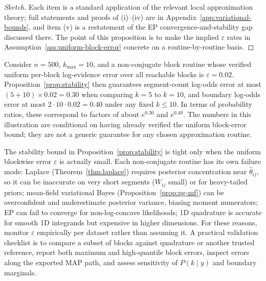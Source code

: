 \begin{proof}[Sketch]
Each item is a standard application of the relevant local approximation theory; full statements
and proofs of (i)--(iv) are in Appendix~\ref{app:variational-bounds}, and item (v) is a
restatement of the EP convergence-and-stability gap discussed there. The point of this proposition
is to make the implied $\varepsilon$ rates in Assumption~\ref{ass:uniform-block-error} concrete on
a routine-by-routine basis.
\end{proof}

\begin{remark}
\label{rem:stability-numerical}
Consider $n=500$, $k_{\max}=10$, and a non-conjugate block routine whose verified uniform
per-block log-evidence error over all reachable blocks is $\varepsilon=0.02$. Proposition~\ref{prop:stability}
then guarantees segment-count log-odds error at most $(5+10)\times0.02=0.30$ when comparing
$k=5$ to $k=10$, and boundary log-odds error at most $2\cdot10\cdot0.02=0.40$ under any fixed
$k\le10$. In terms of probability ratios, these correspond to factors of about $e^{0.30}$ and
$e^{0.40}$. The numbers in this illustration are conditional on having already verified the
uniform block-error bound; they are not a generic guarantee for any chosen approximation routine.
\end{remark}

\begin{remark}
\label{rem:failure-modes}
The stability bound in Proposition~\ref{prop:stability} is tight only when the uniform blockwise
error $\varepsilon$ is actually small. Each non-conjugate routine has its own failure mode:
Laplace (Theorem~\ref{thm:laplace}) requires posterior concentration near $\hat\theta_{ij}$, so
it can be inaccurate on very short segments ($W_{ij}$ small) or for heavy-tailed priors;
mean-field variational Bayes (Proposition~\ref{prop:pg-mf}) can be overconfident and
underestimate posterior variance, biasing moment numerators; EP can fail to converge for
non-log-concave likelihoods; 1D quadrature is accurate for smooth 1D integrands but expensive
in higher dimensions. For these reasons, monitor $\varepsilon$ empirically per
dataset rather than assuming it. A practical validation checklist is to compare a subset of blocks against
quadrature or another trusted reference, report both maximum and high-quantile block errors, inspect
errors along the exported MAP path, and assess sensitivity of $P(k\mid y)$ and boundary marginals.
\end{remark}

